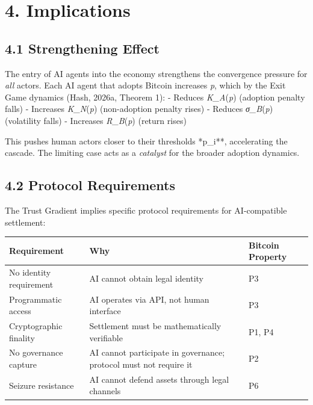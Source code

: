 \documentclass[12pt]{article}
\theoremstyle{definition}
\theoremstyle{remark}
\begin{document}
\section{4. Implications}\label{implications}

\subsection{4.1 Strengthening Effect}\label{strengthening-effect}

The entry of AI agents into the economy strengthens the convergence
pressure for \emph{all} actors. Each AI agent that adopts Bitcoin
increases \emph{p}, which by the Exit Game dynamics (Hash, 2026a,
Theorem 1): - Reduces \emph{K\_A}(\emph{p}) (adoption penalty falls) -
Increases \emph{K\_N}(\emph{p}) (non-adoption penalty rises) - Reduces
\emph{σ\_B}(\emph{p}) (volatility falls) - Increases
\emph{R\_B}(\emph{p}) (return rises)

This pushes human actors closer to their thresholds *p\_i**,
accelerating the cascade. The limiting case acts as a \emph{catalyst}
for the broader adoption dynamics.

\subsection{4.2 Protocol Requirements}\label{protocol-requirements}

The Trust Gradient implies specific protocol requirements for
AI-compatible settlement:

{%
\begin{longtable}[]{@{}
  >{\raggedright\arraybackslash}p{}
  >{\raggedright\arraybackslash}p{}
  >{\raggedright\arraybackslash}p{}@{}}
\toprule\noalign{}
\begin{minipage}[b]{\linewidth}\raggedright
Requirement
\end{minipage} & \begin{minipage}[b]{\linewidth}\raggedright
Why
\end{minipage} & \begin{minipage}[b]{\linewidth}\raggedright
Bitcoin Property
\end{minipage} \\
\midrule\noalign{}
\endhead
\bottomrule\noalign{}
\endlastfoot
No identity requirement & AI cannot obtain legal identity & P3 \\
Programmatic access & AI operates via API, not human interface & P3 \\
Cryptographic finality & Settlement must be mathematically verifiable &
P1, P4 \\
No governance capture & AI cannot participate in governance; protocol
must not require it & P2 \\
Seizure resistance & AI cannot defend assets through legal channels &
P6 \\
\end{longtable}
}
\end{document}
